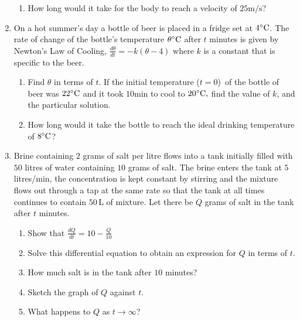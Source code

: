 \begin{enumerate}
\begin{enumerate}
\item How long would it take for the body to reach a velocity of $25 \mathrm{m}/\mbox{s}$? \end{enumerate}


\item On a hot summer's day a
bottle of beer is placed in a fridge set at $4 \mbox{{\ensuremath{{}^\circ}}C}$.  The rate of change of the bottle's temperature
$\theta  \mbox{{\ensuremath{{}^\circ}}C}$ after $t$ minutes is given by Newton's Law of Cooling, $\frac{d \theta }{d t} = -k \left (\theta  -4\right )$ where $k$ is a constant that is specific to the beer. 


\begin{enumerate}
\item Find $\theta $ in terms of $t$.  If the initial temperature ($t =0$)\ of the bottle of beer was $22 \mbox{{\ensuremath{{}^\circ}}C}$ and it took $10 \mbox{min}$ to cool to $20 \mbox{{\ensuremath{{}^\circ}}C}\text{,}$ find the value of $k$, and the particular solution. 

\item How long would it take the bottle to
reach the ideal drinking temperature of $8 \mbox{{\ensuremath{{}^\circ}}C}$? \end{enumerate}


\item Brine
containing $2$ grams of salt per litre flows into a tank initially filled with $50$ litres of water containing $10$ grams of salt.  The brine enters the tank at $5$ litres/$\mbox{min}$, the concentration is kept constant by stirring and the mixture flows out through a tap at
the same rate so that the tank at all times continues to contain $50\,$L of mixture.  Let there be $Q$ grams of salt in the tank after $t$ minutes. 


\begin{enumerate}
\item Show that $\frac{d Q}{d t} =10 -\frac{Q}{10}$ 

\item Solve this differential equation to obtain an expression for $Q$ in terms of $t$. 

\item How much salt is in the tank after $10$ minutes? 

\item Sketch the graph of $Q$ against $t$. 

\item What happens to $Q$ as $t \rightarrow \infty $? \end{enumerate}



\end{enumerate}
